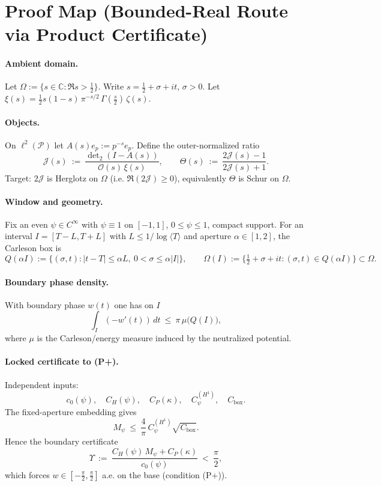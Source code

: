 
\section*{Proof Map (Bounded-Real Route via Product Certificate)}

\paragraph{Ambient domain.} Let $\Omega:=\{s\in\mathbb C:\Re s>\tfrac12\}$. Write $s=\tfrac12+\sigma+it$, $\sigma>0$. Let $\xi(s)=\tfrac12 s(1-s)\,\pi^{-s/2}\,\Gamma(\tfrac{s}{2})\,\zeta(s)$.

\paragraph{Objects.} On $\ell^2(\mathcal P)$ let $A(s)e_p:=p^{-s}e_p$. Define the outer-normalized ratio
\[
  \mathcal J(s)\ :=\ \frac{\det\nolimits_2(I-A(s))}{\mathcal O(s)\,\xi(s)},
  \qquad
  \Theta(s)\ :=\ \frac{2\mathcal J(s)-1}{2\mathcal J(s)+1}.
\]
Target: $2\mathcal J$ is Herglotz on $\Omega$ (i.e. $\Re(2\mathcal J)\ge 0$), equivalently $\Theta$ is Schur on $\Omega$.

\paragraph{Window and geometry.} Fix an even $\psi\in C^\infty$ with $\psi\equiv1$ on $[-1,1]$, $0\le\psi\le1$, compact support. For an interval $I=[T-L,T+L]$ with $L\le 1/\log\langle T\rangle$ and aperture $\alpha\in[1,2]$, the Carleson box is
\[
  Q(\alpha I):=\{(\sigma,t): |t-T|\le \alpha L,\ 0<\sigma\le \alpha|I|\},\qquad
  \Omega(I):=\{\tfrac12+\sigma+it: (\sigma,t)\in Q(\alpha I)\}\subset\Omega.
\]

\paragraph{Boundary phase density.} With boundary phase $w(t)$ one has on $I$
\[
  \int_I (-w'(t))\,dt\ \le\ \pi\,\mu\big(Q(I)\big),
\]
where $\mu$ is the Carleson/energy measure induced by the neutralized potential.

\paragraph{Locked certificate to (P+).} Independent inputs:
\[
  c_0(\psi),\quad C_H(\psi),\quad C_P(\kappa),\quad C^{(H^1)}_\psi,\quad C_{\mathrm{box}}.
\]
The fixed-aperture embedding gives
\[
  M_\psi\ \le\ \frac{4}{\pi}\,C^{(H^1)}_\psi\sqrt{C_{\mathrm{box}}}.
\]
Hence the boundary certificate
\[
  \Upsilon\ :=\ \frac{C_H(\psi)\,M_\psi + C_P(\kappa)}{c_0(\psi)}\ <\ \frac{\pi}{2},
\]
which forces $w\in[-\tfrac{\pi}{2},\tfrac{\pi}{2}]$ a.e. on the base (condition (P+)).

